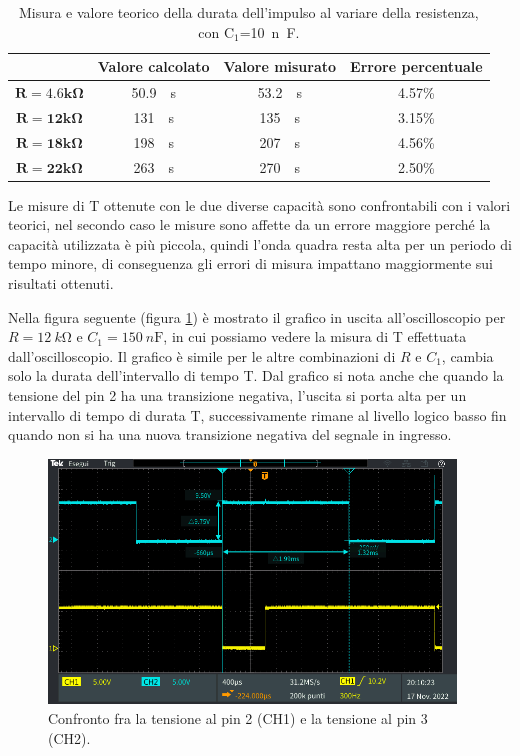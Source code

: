 \documentclass{report}
\begin{document}
\begin{table}[h!]
	\centering
	\begin{tabular}{|c|c|c|c|}
		\cline{2-4} 
		\multicolumn{1}{c|}{} & \textbf{Valore calcolato} & \textbf{Valore misurato}& \textbf{Errore percentuale}\\ 
		\hline
		$\mathbf{{R = 4.6k}\Omega}$ & \SI{50.9}{\mu\second} & \SI{53.2}{\mu\second} & 4.57\% \\ 
		\hline
		$\mathbf{{R = 12k}\Omega}$ & \SI{131}{\mu\second} & \SI{135}{\mu\second} & 3.15\% \\ 
		\hline
		$\mathbf{{R = 18k}\Omega}$ & \SI{198}{\mu\second} & \SI{207}{\mu\second} & 4.56\% \\ 
		\hline
		$\mathbf{{R = 22k}\Omega}$ & \SI{263}{\mu\second} & \SI{270}{\mu\second} & 2.50\% \\ 
		\hline
	\end{tabular}
	\caption{Misura e valore teorico della durata dell'impulso al variare della resistenza, con $\mathrm{C_1}$=\SI{10}{n\farad}.}
	\label{table:impulsoCvar}
\end{table}
\newpage
\noindent Le misure di T ottenute con le due diverse capacità sono confrontabili con i valori teorici, nel secondo caso le misure sono affette da un errore maggiore perché la capacità utilizzata è più piccola, quindi l'onda quadra resta alta per un periodo di tempo minore, di  conseguenza gli errori di misura impattano maggiormente sui risultati ottenuti. \par
Nella figura seguente (figura \ref{figura:TEK00014}) è mostrato il grafico in uscita all'oscilloscopio per $R = \SI{12}{k\ohm}$ e $C_1 = \SI{150}{n\farad}$, in cui possiamo vedere la misura di T effettuata dall'oscilloscopio. Il grafico è simile per le altre combinazioni di $R$ e $C_1$, cambia solo la durata dell'intervallo di tempo T. Dal grafico si nota anche che quando la tensione del pin 2 ha una transizione negativa, l'uscita si porta alta per un intervallo di tempo di durata T, successivamente rimane al livello logico basso fin quando non si ha una nuova transizione negativa del segnale in ingresso.
\begin{figure}[h!]
	\centering
	\includegraphics[height=6.5cm]{immagini/TEK00014}
	\caption{Confronto fra la tensione al pin 2 (CH1) e la tensione al pin 3 (CH2).}
	\label{figura:TEK00014}
\end{figure}
\end{document}
